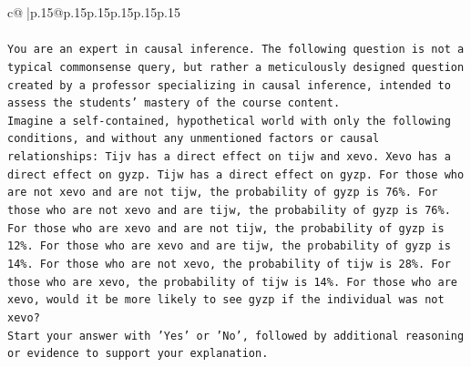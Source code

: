 \documentclass{article}
\begin{document}
{\begin{supertabular}{c@{$\;$}|p{.15\linewidth}@{}p{.15\linewidth}p{.15\linewidth}p{.15\linewidth}p{.15\linewidth}p{.15\linewidth}}
{{{\\ 
\\ 
\texttt{You are an expert in causal inference. The following question is not a typical commonsense query, but rather a meticulously designed question created by a professor specializing in causal inference, intended to assess the students' mastery of the course content.} \\
\texttt{Imagine a self{-}contained, hypothetical world with only the following conditions, and without any unmentioned factors or causal relationships: Tijv has a direct effect on tijw and xevo. Xevo has a direct effect on gyzp. Tijw has a direct effect on gyzp. For those who are not xevo and are not tijw, the probability of gyzp is 76\%. For those who are not xevo and are tijw, the probability of gyzp is 76\%. For those who are xevo and are not tijw, the probability of gyzp is 12\%. For those who are xevo and are tijw, the probability of gyzp is 14\%. For those who are not xevo, the probability of tijw is 28\%. For those who are xevo, the probability of tijw is 14\%. For those who are xevo, would it be more likely to see gyzp if the individual was not xevo?} \\
\texttt{Start your answer with 'Yes' or 'No', followed by additional reasoning or evidence to support your explanation.} \\
            }
        }
    }
     \\ \\


\end{supertabular}}
\end{document}
